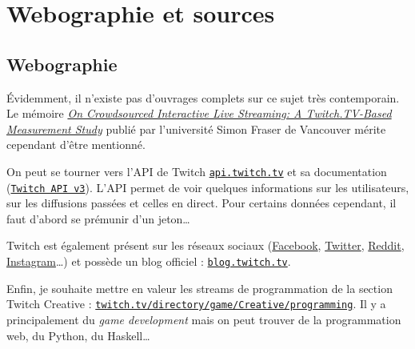 \documentclass[a4paper]{article}
\begin{document}
\newpage 
\section{Webographie et sources}
\subsection{Webographie}
\renewcommand{\refname}{}
Évidemment, il n'existe pas d'ouvrages complets sur ce sujet très contemporain. Le mémoire \href{https://arxiv.org/pdf/1502.04666.pdf}{\textit{On Crowdsourced Interactive Live Streaming: A
Twitch.TV-Based Measurement Study}} publié par l'université Simon Fraser de Vancouver mérite cependant d'être mentionné.

On peut se tourner vers l'API de Twitch \href{https://api.twitch.tv/}{\texttt{api.twitch.tv}} et sa documentation (\href{https://github.com/justintv/twitch-api}{\texttt{Twitch API v3}}). L'API permet de voir quelques informations sur les utilisateurs, sur les diffusions passées et celles en direct. Pour certains données cependant, il faut d'abord se prémunir d'un jeton\ldots

Twitch est également présent sur les réseaux sociaux (\href{https://www.facebook.com/Twitch/}{Facebook}, \href{https://twitter.com/twitch}{Twitter}, \href{https://www.reddit.com/r/twitch}{Reddit}, \href{https://www.instagram.com/twitch/}{Instagram}\ldots) et possède un blog officiel : \href{https://blog.twitch.tv}{\texttt{blog.twitch.tv}}.


Enfin, je souhaite mettre en valeur les streams de programmation de la section Twitch Creative : \href{https://www.twitch.tv/directory/game/Creative/programming}{\texttt{twitch.tv/directory/game/Creative/programming}}. Il y a principalement du \textit{game development} mais on peut trouver de la programmation web, du Python, du Haskell\ldots
\end{document}
